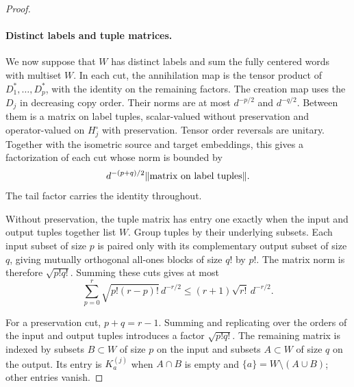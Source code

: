 \begin{proof}
\paragraph{Distinct labels and tuple matrices.}
We now suppose that $W$ has distinct labels and sum the fully centered
words with multiset $W$.  In each cut, the annihilation map is the
tensor product of $D_1^*,\ldots,D_p^*$, with the identity on the
remaining factors.  The creation map uses the $D_j$ in decreasing
copy order.  Their norms are at most $d^{-p/2}$ and $d^{-q/2}$.
Between them is a matrix on label tuples, scalar-valued without
preservation and operator-valued on $H_j^\circ$ with preservation.
Tensor order reversals are unitary.  Together with the isometric
source and target embeddings, this gives a factorization of each cut
whose norm is bounded by
\begin{equation}\label{eq:fw-cut-factorization}
 d^{-(p+q)/2}
       \lVert\text{matrix on label tuples}\rVert.
\end{equation}
The tail factor carries the identity throughout.

Without preservation, the tuple matrix has entry one exactly when
the input and output tuples together list $W$.  Group tuples by
their underlying subsets.  Each input subset of size $p$ is paired
only with its complementary output subset of size $q$, giving
mutually orthogonal all-ones blocks of size $q!$ by $p!$.
The matrix norm is therefore $\sqrt{p!q!}$.  Summing these cuts gives
at most
\begin{equation}\label{eq:fw-no-preservation}
 \sum_{p=0}^r\sqrt{p!(r-p)!}\,d^{-r/2}
 \leq(r+1)\sqrt{r!}\,d^{-r/2}.
\end{equation}

For a preservation cut, $p+q=r-1$.  Summing and replicating over the
orders of the input and output tuples introduces a factor
$\sqrt{p!q!}$.  The remaining matrix is indexed by subsets
$B\subset W$ of size $p$ on the input and subsets $A\subset W$ of
size $q$ on the output.  Its entry is $K_a^{(j)}$ when $A\cap B$
is empty and $\{a\}=W\setminus(A\cup B)$; other entries vanish.


\end{proof}
